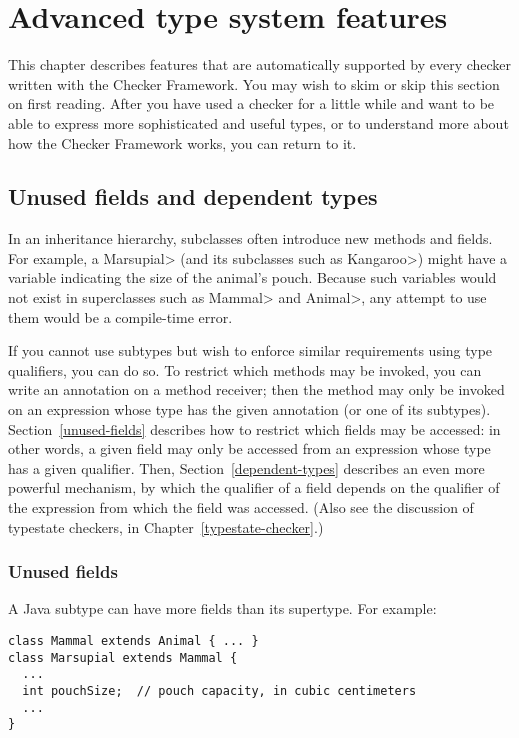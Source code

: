 \htmlhr
\chapter{Advanced type system features\label{advanced-type-system-features}}

This chapter describes features that are automatically supported by every
checker written with the Checker Framework.
You may wish to skim or skip this section on first reading.  After you have
used a checker for a little while and want to be able to express more
sophisticated and useful types, or to understand more about how the Checker
Framework works, you can return to it.


\section{Unused fields and dependent types\label{unused-fields-and-dependent-types}}

In an inheritance hierarchy, subclasses often introduce new methods and
fields.  For example, a \<Marsupial> (and its subclasses such as
\<Kangaroo>) might have a variable indicating the size of the animal's
pouch.  Because such variables would not exist in superclasses such as
\<Mammal> and \<Animal>, any attempt to use them would be a compile-time
error.

If you cannot use subtypes but wish to enforce similar requirements using
type qualifiers, you can do so.  To restrict which methods may be invoked,
you can write an annotation on a method receiver; then the method may only
be invoked on an expression whose type has the given annotation (or one of
its subtypes).  Section~\ref{unused-fields} describes how to restrict which
fields may be accessed:  in other words, a given field may only be accessed
from an expression whose type has a given qualifier.  Then,
Section~\ref{dependent-types} describes an even more powerful mechanism, by
which the qualifier of a field depends on the qualifier of the expression
from which the field was accessed.
(Also see the discussion of typestate checkers, in
Chapter~\ref{typestate-checker}.)


\subsection{Unused fields\label{unused-fields}}

A Java subtype can have more fields than its supertype.  For example:

\begin{Verbatim}
class Mammal extends Animal { ... }
class Marsupial extends Mammal {
  ...
  int pouchSize;  // pouch capacity, in cubic centimeters
  ...
}
\end{Verbatim}

